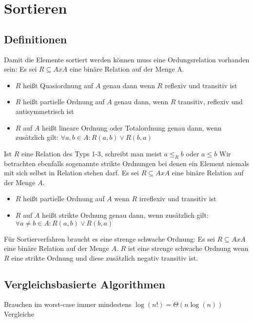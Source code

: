 \documentclass[a4paper]{article}
\begin{document}
	\section{Sortieren}
	\subsection{Definitionen}
	Damit die Elemente sortiert werden können muss eine Ordungsrelation vorhanden sein: \newline \newline
	Es sei $R\subseteq AxA$ eine binäre Relation auf der Menge A.
	\begin{itemize}
		\item $R$ heißt Quasiordnung auf $A$ genau dann wenn $R$ reflexiv und transitiv ist
		\item $R$ heißt partielle Ordnung auf $A$ genau dann, wenn $R$ transitiv, reflexiv und antisymmetrisch ist
		\item $R$ auf $A$ heißt lineare Ordnung oder Totalordnung genau dann, wenn zusätzlich gilt: $\forall a, b\in A:R(a, b)\lor R(b, a)$
	\end{itemize}
	Ist $R$ eine Relation des Typs 1-3, schreibt man meist $a\leq_Rb$ oder $a\leq b$ \newline
	Wir betrachten ebenfalls sogenannte strikte Ordnungen bei denen ein Element niemals mit sich selbst in Relation  stehen darf. \newline \newline
	Es sei $R\subseteq AxA$ eine binäre Relation auf der Menge $A$.
	\begin{itemize}
	  \item $R$ heißt partielle Ordnung auf $A$ wenn $R$ irreflexiv und transitiv ist
	  \item $R$ auf $A$ heißt strikte Ordnung genau dann, wenn zusätzlich gilt: \newline
	  		$\forall a\not= b\in A:R(a,b)\lor R(b,a)$
	\end{itemize} 
	Für Sortierverfahren braucht es eine strenge schwache Ordnung: \newline \newline
	Es sei $R\subseteq AxA$ eine binäre Relation auf der Menge $A$. $R$ ist eine strenge schwache Ordnung wenn $R$ eine strikte Ordnung und diese zusätzlich negativ transitiv ist.
	\newpage
	\subsection{Vergleichsbasierte Algorithmen}
	Brauchen im worst-case immer mindestens $\log(n!)=\Theta(n\log(n))$ Vergleiche
\end{document}
